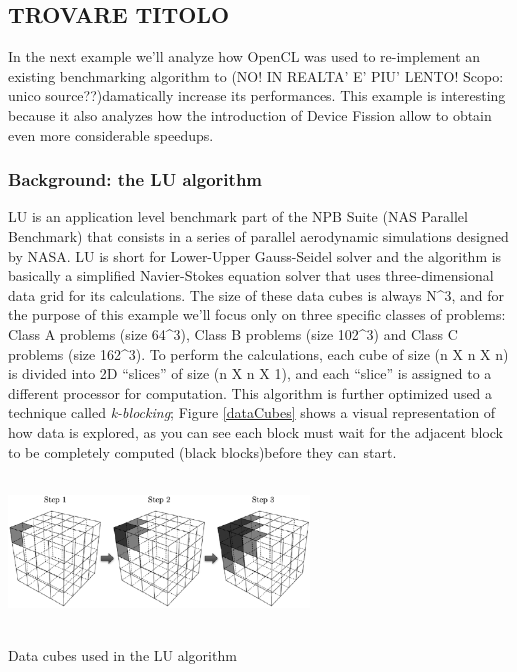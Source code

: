 
\subsection{TROVARE TITOLO}

In the next example \cite{Pennycook2012} we'll analyze how OpenCL was used to re-implement an existing benchmarking algorithm to (NO! IN REALTA' E' PIU' LENTO! Scopo: unico source??)damatically increase its performances. This example is interesting because it also analyzes how the introduction of Device Fission allow to obtain even more considerable speedups.

\subsubsection{Background: the LU algorithm}

LU is an application level benchmark part of the NPB Suite (NAS Parallel Benchmark) that consists in a series of parallel aerodynamic simulations designed by NASA. LU is short for Lower-Upper Gauss-Seidel solver and the algorithm is basically a simplified Navier-Stokes equation solver that uses three-dimensional data grid for its calculations. The size of these data cubes is always N^3, and for the purpose of this example we'll focus only on three specific classes of problems: Class A problems (size 64^3), Class B problems (size 102^3) and Class C problems (size 162^3).
To perform the calculations, each cube of size (n X n X n) is divided into 2D "`slices"' of size (n X n X 1), and each "`slice"' is assigned to a different processor for computation. This algorithm is further optimized used a technique called \textit{k-blocking}; Figure \ref{dataCubes} shows a visual representation of how data is explored, as you can see each block must wait for the adjacent block to be completely computed (black blocks)before they can start.

\begin{figurehere}
 \centering
 \includegraphics[width=8cm, height=4cm]{./eps/dataCube.eps}
 \caption{Data cubes used in the LU algorithm}
 \label{fig:dataCubes}
\end{figurehere}


